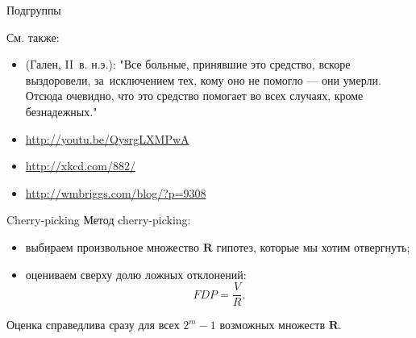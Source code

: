 \documentclass[9pt,pdf,utf8,hyperref={unicode},aspectratio=169]{beamer}
\begin{document}
\begin{frame}{Подгруппы}
{    \bigskip

    См. также:
    \begin{itemize}
	    \item (Гален, II~в. н.э.): "Все больные, принявшие это средство, вскоре выздоровели, за~исключением тех, кому оно не помогло — они умерли. Отсюда очевидно, что это средство помогает во всех случаях, кроме безнадежных." 
        \item \url{http://youtu.be/QysrgLXMPwA}
        \item \url{http://xkcd.com/882/}
        \item \url{http://wmbriggs.com/blog/?p=9308}
    \end{itemize}
    }
\end{frame}

\begin{frame}{Cherry-picking}
	Метод cherry-picking:
	\begin{itemize}
		\item выбираем произвольное множество $\mathbf{R}$ гипотез, которые мы хотим отвергнуть;
		\item оцениваем сверху долю ложных отклонений: $$FDP=\frac{V}{R}.$$
	\end{itemize}
	
	Оценка справедлива сразу для всех $2^m-1$ возможных множеств $\mathbf{R}$.
\end{frame}
\end{document}
